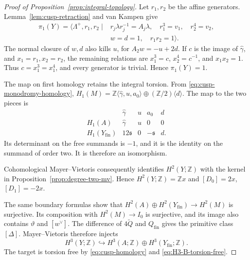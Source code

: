 \documentclass[11pt]{article}
\theoremstyle{definition}
\theoremstyle{remark}
\numberwithin{equation}{section}
\begin{document}
\begin{proof}[Proof of Proposition~\ref{prop:integral-topology}]
Let $r_1,r_2$ be the affine generators.  Lemma~\ref{lem:cusp-retraction}
and van Kampen give
\[
 \begin{split}
 \pi_1(Y)=\langle\Lambda^+,r_1,r_2\mid{}&
 r_j\lambda r_j^{-1}=A_j\lambda,
 \quad r_1^3=v_1,\quad r_2^4=v_2,\\
 &w=d=1,\quad r_1r_2=1\rangle.
 \end{split}
\]
The normal closure of $w,d$ also kills $u$, for
$A_2w=-u+2d$.  If $c$ is the image of $\widehat\gamma$, and
$x_1=r_1,x_2=r_2$, the remaining relations are
$x_1^3=c$, $x_2^4=c^{-1}$, and $x_1x_2=1$.
Thus $c=x_1^3=x_1^4$, and every generator is trivial.  Hence
$\pi_1(Y)=1$.

The map on first homology retains the integral torsion.  From
\eqref{eq:cusp-monodromy-homology},
$H_1(M)=\mathbb Z\langle\widehat\gamma,u,a_0\rangle
\oplus(\mathbb Z/2)\langle d\rangle$.
The map to the two pieces is
\begin{equation*}
 \begin{array}{c|cccc}
  &\widehat\gamma&u&a_0&d\\ \hline
 H_1(A)&\widehat\gamma&u&0&0\\
 H_1(Y_{\mathrm{fin}})&12\mathfrak s&0&-\mathfrak s&d.
 \end{array}
\end{equation*}
Its determinant on the free summands is $-1$, and it is the identity on
the summand of order two.  It is therefore an isomorphism.

Cohomological Mayer--Vietoris consequently identifies $H^2(Y;\mathbb Z)$
with the kernel in
Proposition~\ref{prop:degree-two-mv}.  Hence
$H^2(Y;\mathbb Z)=\mathbb Zx$ and
$[D_0]=2x$, $[D_1]=-2x$.

The same boundary formulas show that
$H^2(A)\oplus H^2(Y_{\mathrm{fin}})\to H^2(M)$ is surjective.  Its
composition with $H^2(M)\to I_0$ is surjective, and its image also contains
$\vartheta$ and $[w^\vee]$.  The difference of
$4\widetilde Q$ and $Q_{\mathrm{fin}}$ gives the primitive class
$[\Delta]$.  Mayer--Vietoris therefore injects
\begin{equation}\label{eq:H3-Y-injection}
 H^3(Y;\mathbb Z)\hookrightarrow
 H^3(A;\mathbb Z)\oplus H^3(Y_{\mathrm{fin}};\mathbb Z).
\end{equation}
The target is torsion free by \eqref{eq:cusp-homology} and
\eqref{eq:H3-B-torsion-free}.


\end{proof}
\end{document}
